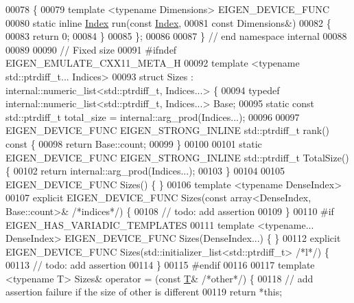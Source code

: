 \begin{DoxyCode}
00078 \{
00079   \textcolor{keyword}{template} <\textcolor{keyword}{typename} Dimensions> EIGEN\_DEVICE\_FUNC
00080   \textcolor{keyword}{static} \textcolor{keyword}{inline} \hyperlink{namespace_eigen_a62e77e0933482dafde8fe197d9a2cfde}{Index} run(\textcolor{keyword}{const} \hyperlink{namespace_eigen_a62e77e0933482dafde8fe197d9a2cfde}{Index},
00081                           \textcolor{keyword}{const} Dimensions&)
00082   \{
00083     \textcolor{keywordflow}{return} 0;
00084   \}
00085   \};
00086 
00087 \}  \textcolor{comment}{// end namespace internal}
00088 
00089 
00090 \textcolor{comment}{// Fixed size}
00091 \textcolor{preprocessor}{#ifndef EIGEN\_EMULATE\_CXX11\_META\_H}
00092 \textcolor{keyword}{template} <\textcolor{keyword}{typename} std::ptrdiff\_t... Indices>
00093 \textcolor{keyword}{struct }Sizes : internal::numeric\_list<std::ptrdiff\_t, Indices...> \{
00094   \textcolor{keyword}{typedef} internal::numeric\_list<std::ptrdiff\_t, Indices...> Base;
00095   \textcolor{keyword}{static} \textcolor{keyword}{const} std::ptrdiff\_t total\_size = internal::arg\_prod(Indices...);
00096 
00097   EIGEN\_DEVICE\_FUNC EIGEN\_STRONG\_INLINE std::ptrdiff\_t rank()\textcolor{keyword}{ const }\{
00098     \textcolor{keywordflow}{return} Base::count;
00099   \}
00100 
00101   \textcolor{keyword}{static} EIGEN\_DEVICE\_FUNC EIGEN\_STRONG\_INLINE std::ptrdiff\_t TotalSize() \{
00102     \textcolor{keywordflow}{return} internal::arg\_prod(Indices...);
00103   \}
00104 
00105   EIGEN\_DEVICE\_FUNC Sizes() \{ \}
00106   \textcolor{keyword}{template} <\textcolor{keyword}{typename} DenseIndex>
00107   \textcolor{keyword}{explicit} EIGEN\_DEVICE\_FUNC Sizes(\textcolor{keyword}{const} array<DenseIndex, Base::count>& \textcolor{comment}{/*indices*/}) \{
00108     \textcolor{comment}{// todo: add assertion}
00109   \}
00110 \textcolor{preprocessor}{#if EIGEN\_HAS\_VARIADIC\_TEMPLATES}
00111   \textcolor{keyword}{template} <\textcolor{keyword}{typename}... DenseIndex> EIGEN\_DEVICE\_FUNC Sizes(DenseIndex...) \{ \}
00112   \textcolor{keyword}{explicit} EIGEN\_DEVICE\_FUNC Sizes(std::initializer\_list<std::ptrdiff\_t> \textcolor{comment}{/*l*/}) \{
00113     \textcolor{comment}{// todo: add assertion}
00114   \}
00115 \textcolor{preprocessor}{#endif}
00116 
00117   \textcolor{keyword}{template} <\textcolor{keyword}{typename} T> Sizes& operator = (\textcolor{keyword}{const} \hyperlink{group___sparse_core___module_class_eigen_1_1_triplet}{T}& \textcolor{comment}{/*other*/}) \{
00118     \textcolor{comment}{// add assertion failure if the size of other is different}
00119     \textcolor{keywordflow}{return} *\textcolor{keyword}{this};

\end{DoxyCode}
